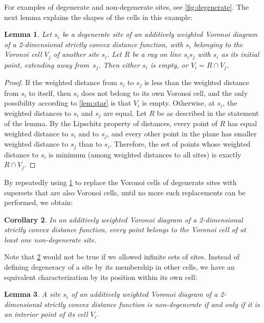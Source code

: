\documentclass[11pt]{article}
\newtheorem{lemma}{Lemma}
\newtheorem{corollary}[lemma]{Corollary}
\theoremstyle{definition}
\begin{document}
For examples of degenerate and non-degenerate sites, see \cref{fig:degenerate}. The next lemma explains the shapes of the cells in this example:

\begin{lemma}
\label{lem:ray}
Let $s_i$ be a degenerate site of an additively weighted Voronoi diagram of a 2-dimensional strictly convex distance function, with $s_i$ belonging to the Voronoi cell $V_j$ of another site $s_i$. Let $R$ be a ray on line $s_is_j$ with $s_i$ as its initial point, extending away from~$s_j$.
 Then either $s_i$ is empty, or $V_i=R\cap V_j$.
\end{lemma}

\begin{proof}
If the weighted distance from $s_i$ to $s_j$ is less than the weighted distance from $s_i$ to itself, then $s_i$ does not belong to its own Voronoi cell, and the only possibility according to \cref{lem:star} is that $V_i$ is empty. Otherwise, at $s_i$, the weighted distances to $s_i$ and $s_j$ are equal. Let $R$ be as described in the statement of the lemma. By the Lipschitz property of distances, every point of $R$ has equal weighted distance to $s_i$ and to $s_j$, and every other point in the plane has smaller weighted distance to $s_j$ than to $s_i$. Therefore, the set of points whose weighted distance to $s_i$ is minimum (among weighted distances to all sites) is exactly $R\cap V_j$.
\end{proof}

By repeatedly using \cref{lem:ray} to replace the Voronoi cells of degenerate sites with supersets that are also Voronoi cells, until no more such replacements can be performed, we obtain:

\begin{corollary}
\label{cor:non-degenerate-cover}
In an additively weighted Voronoi diagram of a 2-dimensional strictly convex distance function, every point belongs to the Voronoi cell of at least one non-degenerate site.
\end{corollary}

Note that \cref{cor:non-degenerate-cover} would not be true if we allowed infinite sets of sites. Instead of defining degeneracy of a site by its membership in other cells, we have an equivalent characterization by its position within its own cell:

\begin{lemma}
\label{lem:non-degenerate-interior}
A site $s_i$ of an additively weighted Voronoi diagram of a 2-dimensional strictly convex distance function is non-degenerate if and only if it is an interior point of its cell $V_i$.
\end{lemma}
\end{document}

